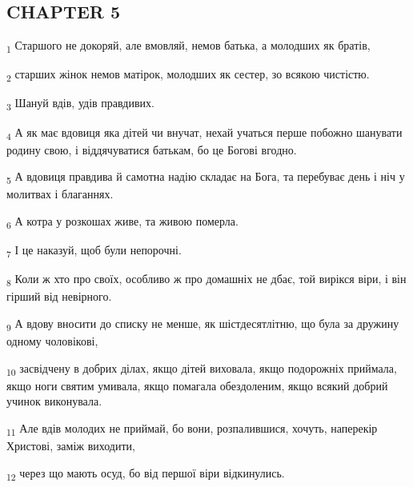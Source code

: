 \subsection{CHAPTER 5}
\begin{tcolorbox}
\textsubscript{1} Старшого не докоряй, але вмовляй, немов батька, а молодших як братів,
\end{tcolorbox}
\begin{tcolorbox}
\textsubscript{2} старших жінок немов матірок, молодших як сестер, зо всякою чистістю.
\end{tcolorbox}
\begin{tcolorbox}
\textsubscript{3} Шануй вдів, удів правдивих.
\end{tcolorbox}
\begin{tcolorbox}
\textsubscript{4} А як має вдовиця яка дітей чи внучат, нехай учаться перше побожно шанувати родину свою, і віддячуватися батькам, бо це Богові вгодно.
\end{tcolorbox}
\begin{tcolorbox}
\textsubscript{5} А вдовиця правдива й самотна надію складає на Бога, та перебуває день і ніч у молитвах і благаннях.
\end{tcolorbox}
\begin{tcolorbox}
\textsubscript{6} А котра у розкошах живе, та живою померла.
\end{tcolorbox}
\begin{tcolorbox}
\textsubscript{7} І це наказуй, щоб були непорочні.
\end{tcolorbox}
\begin{tcolorbox}
\textsubscript{8} Коли ж хто про своїх, особливо ж про домашніх не дбає, той вирікся віри, і він гірший від невірного.
\end{tcolorbox}
\begin{tcolorbox}
\textsubscript{9} А вдову вносити до списку не менше, як шістдесятлітню, що була за дружину одному чоловікові,
\end{tcolorbox}
\begin{tcolorbox}
\textsubscript{10} засвідчену в добрих ділах, якщо дітей виховала, якщо подорожніх приймала, якщо ноги святим умивала, якщо помагала обездоленим, якщо всякий добрий учинок виконувала.
\end{tcolorbox}
\begin{tcolorbox}
\textsubscript{11} Але вдів молодих не приймай, бо вони, розпалившися, хочуть, наперекір Христові, заміж виходити,
\end{tcolorbox}
\begin{tcolorbox}
\textsubscript{12} через що мають осуд, бо від першої віри відкинулись.
\end{tcolorbox}
